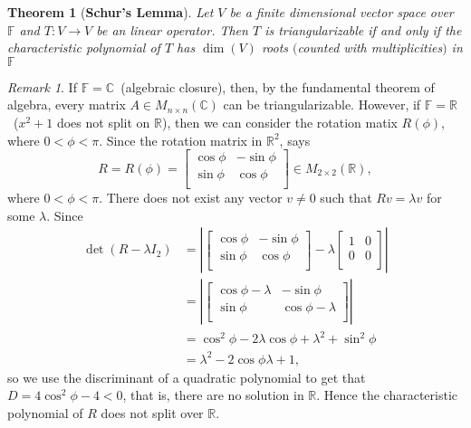 \documentclass[12pt,reqno]{amsart}
\theoremstyle{plain}
\newcommand{\R}{\mathbb{R}}
\newcommand{\C}{\mathbb{C}}
\newcommand{\F}{\mathbb{F}}
\newtheorem{theorem}{Theorem}[section]
\theoremstyle{remark}
\newtheorem*{remark}{Remark}
\begin{document}
\begin{theorem}[\textbf{Schur's Lemma}]
	Let $V$ be a finite dimensional vector space over $\F$ and $T:V \rightarrow V$ be an linear operator. Then $T$ is triangularizable if and only if  the characteristic polynomial of $T$ has $\dim(V)$ roots $($counted with multiplicities$)$ in $\F$
\end{theorem}

\begin{remark}
		If $\F =\C$~(algebraic closure), then, by the fundamental theorem of algebra, every matrix $A \in M_{n \times n}(\C)$ can be triangularizable. However, if $\F = \R$~($x^2 + 1$ does not split on $\R$), then we can consider the rotation matix $R(\phi)$, where $0 <\phi < \pi$. Since the rotation matrix in $\R^2$, says
		$$ R = R(\phi) = 
		\begin{bmatrix}
			\cos\phi& -\sin\phi\\
			\sin\phi& \cos\phi \\
		\end{bmatrix} \in M_{2 \times 2}(\R),
		$$ 
		where $0 <\phi < \pi$. There does not exist any vector $v \ne 0$ such that $R v = \lambda v$ for some $\lambda$. Since 
		\begin{align*}
			\det(R - \lambda I_2) 
			& = |\begin{bmatrix}
				\cos\phi& -\sin\phi\\
				\sin\phi& \cos\phi \\
			\end{bmatrix} - 
			\lambda\begin{bmatrix}
				1& 0\\
				0& 0 \\
			\end{bmatrix} |\\
			& = |\begin{bmatrix}
				\cos\phi - \lambda& -\sin\phi\\
				\sin\phi& \cos\phi - \lambda\\
			\end{bmatrix}|\\
			& = \cos^2\phi - 2\lambda \cos\phi + \lambda^2 + \sin^2\phi \\
			& = \lambda^2 - 2\cos\phi\lambda +1,
		\end{align*}
		so we use the discriminant of a quadratic polynomial to get that $D = 4\cos^2\phi - 4<0$, that is, there are no solution in $\R$. Hence the characteristic polynomial of $R$ does not split over $\R$.
\end{remark}
\end{document}
